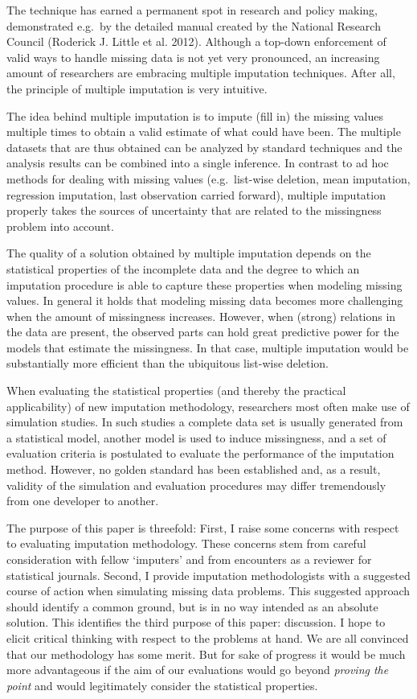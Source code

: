 \documentclass[
]{article}
\begin{document}
The technique has earned a permanent spot in research and policy making,
demonstrated e.g.~by the detailed manual created by the National
Research Council (Roderick J. Little et al. 2012). Although a top-down
enforcement of valid ways to handle missing data is not yet very
pronounced, an increasing amount of researchers are embracing multiple
imputation techniques. After all, the principle of multiple imputation
is very intuitive.

The idea behind multiple imputation is to impute (fill in) the missing
values multiple times to obtain a valid estimate of what could have
been. The multiple datasets that are thus obtained can be analyzed by
standard techniques and the analysis results can be combined into a
single inference. In contrast to ad hoc methods for dealing with missing
values (e.g.~list-wise deletion, mean imputation, regression imputation,
last observation carried forward), multiple imputation properly takes
the sources of uncertainty that are related to the missingness problem
into account.

The quality of a solution obtained by multiple imputation depends on the
statistical properties of the incomplete data and the degree to which an
imputation procedure is able to capture these properties when modeling
missing values. In general it holds that modeling missing data becomes
more challenging when the amount of missingness increases. However, when
(strong) relations in the data are present, the observed parts can hold
great predictive power for the models that estimate the missingness. In
that case, multiple imputation would be substantially more efficient
than the ubiquitous list-wise deletion.

When evaluating the statistical properties (and thereby the practical
applicability) of new imputation methodology, researchers most often
make use of simulation studies. In such studies a complete data set is
usually generated from a statistical model, another model is used to
induce missingness, and a set of evaluation criteria is postulated to
evaluate the performance of the imputation method. However, no golden
standard has been established and, as a result, validity of the
simulation and evaluation procedures may differ tremendously from one
developer to another.

The purpose of this paper is threefold: First, I raise some concerns
with respect to evaluating imputation methodology. These concerns stem
from careful consideration with fellow `imputers' and from encounters as
a reviewer for statistical journals. Second, I provide imputation
methodologists with a suggested course of action when simulating missing
data problems. This suggested approach should identify a common ground,
but is in no way intended as an absolute solution. This identifies the
third purpose of this paper: discussion. I hope to elicit critical
thinking with respect to the problems at hand. We are all convinced that
our methodology has some merit. But for sake of progress it would be
much more advantageous if the aim of our evaluations would go beyond
\emph{proving the point} and would legitimately consider the statistical
properties.
\end{document}
